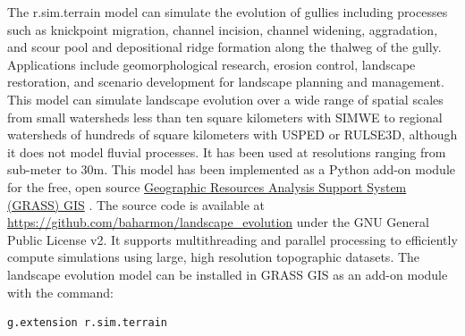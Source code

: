 \documentclass[gmd, manuscript]{copernicus}
\begin{document}
The r.sim.terrain model
can simulate the evolution of gullies
including processes such as 
knickpoint migration,
channel incision, 
channel widening, 
aggradation, and
scour pool and 
depositional ridge formation
along the thalweg of the gully. 
Applications include 
geomorphological research,
erosion control, 
landscape restoration, 
and scenario development 
for landscape planning and management.
This model can simulate landscape evolution 
over a wide range of spatial scales 
from small watersheds 
less than ten square kilometers
with SIMWE
to regional watersheds
of hundreds of square kilometers
with USPED or RULSE3D,
although it does not model fluvial processes. 
It has been used at resolutions ranging from sub-meter to 30m.
This model has been implemented 
as a Python add-on module 
for the free, open source
\href{https://grass.osgeo.org/}{Geographic Resources Analysis Support System (GRASS) GIS}
\citep{GRASS}. 
The source code is available at 
\url{https://github.com/baharmon/landscape\_evolution} 
under the GNU General Public License v2.
It supports multithreading and parallel processing
to efficiently compute simulations 
using large, high resolution topographic datasets.
%
The landscape evolution model 
can be installed in GRASS GIS as an add-on module 
with the command: 
\begin{verbatim}
g.extension r.sim.terrain
\end{verbatim}
\end{document}
